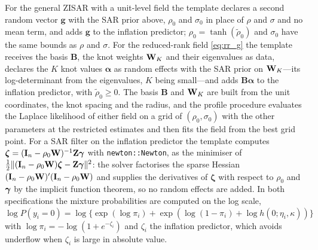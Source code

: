 For the general ZISAR with a unit-level field the template declares a second random vector $\mathbf{g}$ with the SAR prior above, $\rho_0$ and $\sigma_0$ in place of $\rho$ and $\sigma$ and no mean term, and adds $\mathbf{g}$ to the inflation predictor; $\rho_0 = \tanh(\tilde\rho_0)$ and $\sigma_0$ have the same bounds as $\rho$ and $\sigma$.
For the reduced-rank field \eqref{eq:rr_g} the template receives the basis $\mathbf{B}$, the knot weights $\mathbf{W}_K$ and their eigenvalues as data, declares the $K$ knot values $\boldsymbol\alpha$ as random effects with the SAR prior on $\mathbf{W}_K$---its log-determinant from the eigenvalues, $K$ being small---and adds $\mathbf{B}\boldsymbol\alpha$ to the inflation predictor, with $\tilde\rho_0 \ge 0$.
The basis $\mathbf{B}$ and $\mathbf{W}_K$ are built from the unit coordinates, the knot spacing and the radius, and the profile procedure evaluates the Laplace likelihood of either field on a grid of $(\rho_0, \sigma_0)$ with the other parameters at the restricted estimates and then fits the field from the best grid point.
For a SAR filter on the inflation predictor the template computes $\boldsymbol{\zeta} = (\mathbf{I}_n - \rho_0\mathbf{W})^{-1}\mathbf{Z}\boldsymbol{\gamma}$ with \texttt{newton::Newton}, as the minimiser of $\tfrac12\|(\mathbf{I}_n - \rho_0\mathbf{W})\boldsymbol{\zeta} - \mathbf{Z}\boldsymbol{\gamma}\|^2$: the solver factorises the sparse Hessian $(\mathbf{I}_n - \rho_0\mathbf{W})'(\mathbf{I}_n - \rho_0\mathbf{W})$ and supplies the derivatives of $\boldsymbol{\zeta}$ with respect to $\rho_0$ and $\boldsymbol{\gamma}$ by the implicit function theorem, so no random effects are added.
In both specifications the mixture probabilities are computed on the log scale, $\log P(y_i = 0) = \log\{\exp(\log\pi_i) + \exp(\log(1-\pi_i) + \log h(0;\eta_i,\kappa))\}$ with $\log\pi_i = -\log(1 + e^{-\zeta_i})$ and $\zeta_i$ the inflation predictor, which avoids underflow when $\zeta_i$ is large in absolute value.
